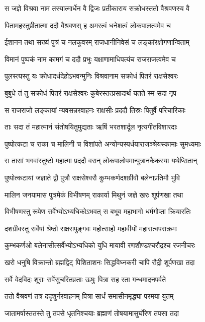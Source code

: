 \twolineshloka
{स जज्ञे विश्रवा नाम तस्यात्मार्धेन वै द्विजः}
{प्रतीकाराय सक्रोधस्ततो वैश्रवणस्य वै}


\twolineshloka
{पितामहस्तुप्रीतात्मा ददौ वैश्रवणस् ह}
{अमरत्वं धनेशत्वं लोकपालत्वमेव च}


\twolineshloka
{ईशानन तथा सख्यं पुत्रं च नलकूवरम्}
{राजधानीनिवेसं च लङ्कांरक्षोगणान्विताम्}


\twolineshloka
{विमानं पुष्पकं नाम कामगं च ददौ प्रभुः}
{यक्षाणामाधिपत्यंच राजराजत्वमेव च}




\twolineshloka
{पुलस्त्यस्तु यः क्रोधादर्धदेहोऽभवन्मुनिः}
{विश्रवानाम सक्रोधं पितरं राक्षसेश्वरः}


\twolineshloka
{बुबुधे तं तु सक्रोधं पितरं राक्षसेश्वरः}
{कुबेरस्तत्प्रसादार्थं यतते स्म सदा नृप}


\twolineshloka
{स राजराजो लङ्कायां न्यवसन्नरवाहनः}
{राक्षसीः प्रददौ तिस्रः पितुर्वै परिचारिकाः}


\twolineshloka
{ताः सदा तं महात्मानं संतोषयितुमुद्यताः}
{ऋषिं भरतशार्दूल नृत्यगीतविशारदाः}


\twolineshloka
{पुष्पोत्कटा च राका च मालिनी च विशांपते}
{अन्योन्यस्पर्धयाराजञ्श्रेयस्कामाः सुमध्यमाः}


\twolineshloka
{स तासां भगवांस्तुष्टो महात्मा प्रददौ वरान्}
{लोकपालोपमान्पुत्रानकैकस्या यथेप्सितान्}


\twolineshloka
{पुष्पोत्कटायां जज्ञाते द्वौ पुत्रौ राक्षसेश्वरौ}
{कुम्भकर्णदशग्रीवौ बलेनाप्रतिमौ भुवि}


\twolineshloka
{मालिन जनयामास पुत्रमेकं विभीषणम्}
{राकार्या मिथुनं जज्ञे खरः शूर्पणखा तथा}


\twolineshloka
{विभीषणस्तु रूपेण सर्वेभ्योऽभ्यधिकोऽभवत्}
{स बभूव महाभागो धर्मगोप्ता क्रियारतिः}


\twolineshloka
{दशग्रीवस्तु सर्वेषां श्रेष्ठो राक्षसपुङ्गवः}
{महोत्साहो महावीर्यो महासत्वपराक्रमः}


\twolineshloka
{कुम्भकर्णओ बलेनासीत्सर्वेभ्योऽभ्यधिको युधि}
{मायावी रणशौण्डश्चरौद्रश्च रजनीचरः}


\twolineshloka
{खरो धनुषि विक्रान्तो ब्रह्मद्विट् पिशिताशनः}
{सिद्धविघ्नकरी चापि रौद्री शूर्पणखा तदा}


\twolineshloka
{सर्वे वेदविदः शूराः सर्वेसुचरितव्रताः}
{ऊषुः पित्रा सह रता गन्धमादनपर्वते}


\twolineshloka
{ततो वैश्रवणं तत्र ददृशुर्नरवाहनम्}
{पित्रा सार्धं समासीनमृद्ध्या परमया युतम्}


\twolineshloka
{जातामर्षास्ततस्ते तु तपसे धृतनिश्चयाः}
{ब्रह्माणं तोषयामासुर्घोरेण तपसा तदा}


